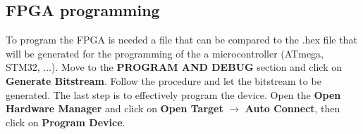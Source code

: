 \subsection{FPGA programming}
To program the FPGA is needed a file that can be compared to the .hex file that will be generated for the programming of the a microcontroller (ATmega, STM32, ...). Move to the \textbf{PROGRAM AND DEBUG} section and click on \textbf{Generate Bitstream}. Follow the procedure and let the bitstream to be generated. The last step is to effectively program the device. Open the \textbf{Open Hardware Manager} and click on \textbf{Open Target} $\rightarrow$ \textbf{Auto Connect}, then click on \textbf{Program Device}.